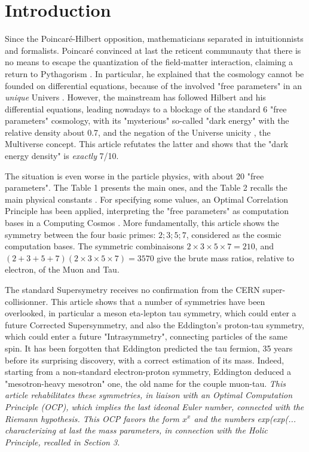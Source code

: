 \documentclass[a4paper,9pt]{article}
\newcounter{col}
\begin{document}
\section{Introduction}

Since the Poincaré-Hilbert opposition, mathematicians separated in intuitionnists and formalists. Poincaré convinced at last the reticent communauty that there is no means to escape the quantization of the field-matter interaction, claiming a return to Pythagorism \cite{Poincare1}. In particular, he explained that the cosmology cannot be founded on differential equations, because of the involved "free parameters" in an \textit{unique} Univers \cite{Poincare2}. However, the mainstream has followed Hilbert and his differential equations, leading nowadays to a blockage of the standard 6 "free parameters" cosmology, with its "mysterious" so-called "dark energy" with the relative density about 0.7\cite{Zyla}, and the negation of the Universe unicity \cite{Rees}, the Multiverse concept. This article refutates the latter and shows that the "dark energy density" is \textit{exactly} 7/10.

The situation is even worse in the particle physics, with about 20 "free parameters". The Table 1 presents the main ones, and the Table 2 recalls the main physical constants \cite{Zyla}. For specifying some values, an Optimal Correlation Principle has been applied, interpreting the "free parameters" as computation bases in a Computing Cosmos \cite {Sanchez2}. More fundamentally, this article shows the symmetry between the four basic primes: $2;3;5;7$, considered as the cosmic computation bases. The symmetric combinaisons $2\times 3\times5\times7 = 210 $, and $(2 + 3+  5 +7)(2\times 3\times5\times7) = 3570$ give the brute mass ratios, relative to electron, of the Muon and Tau.

The standard Supersymetry receives no confirmation from the CERN super-collisionner. This article shows that a number of symmetries have been overlooked, in particular a meson eta-lepton tau symmetry, which could enter a future Corrected Supersymmetry, and also the Eddington's proton-tau symmetry, which could enter a future "Intrasymmetry", connecting particles of the same spin. It has been forgotten that Eddington predicted the tau fermion, 35 years before its surprising discovery, with a correct estimation of its mass. Indeed, starting from a non-standard electron-proton symmetry, Eddington deduced a "mesotron-heavy mesotron" one, the old name for the couple muon-tau. \textit{This article rehabilitates these symmetries, in liaison with an Optimal Computation Principle (OCP), which implies the last ideonal Euler number, connected with the Riemann hypothesis. This OCP favors the form $x^x$ and the numbers exp(exp(... characterizing at last the mass parameters, in connection with the Holic Principle, recalled in Section 3.} 
\end{document}
